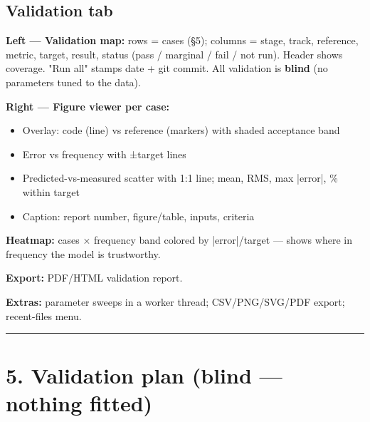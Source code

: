 \documentclass[10pt,a4paper]{article}
\begin{document}
\subsection*{Validation tab}

\textbf{Left — Validation map:} rows = cases (§5); columns = stage, track, reference, metric, target, result, status (pass / marginal / fail / not run). Header shows coverage. "Run all" stamps date + git commit. All validation is \textbf{blind} (no parameters tuned to the data).

\textbf{Right — Figure viewer per case:}

\begin{itemize}
\item Overlay: code (line) vs reference (markers) with shaded acceptance band
\item Error vs frequency with ±target lines
\item Predicted-vs-measured scatter with 1:1 line; mean, RMS, max |error|, \% within target
\item Caption: report number, figure/table, inputs, criteria
\end{itemize}

\textbf{Heatmap:} cases × frequency band colored by |error|/target — shows where in frequency the model is trustworthy.

\textbf{Export:} PDF/HTML validation report.

\textbf{Extras:} parameter sweeps in a worker thread; CSV/PNG/SVG/PDF export; recent-files menu.

\noindent\rule{\linewidth}{0.4pt}

\section*{5. Validation plan (blind — nothing fitted)}
\end{document}
